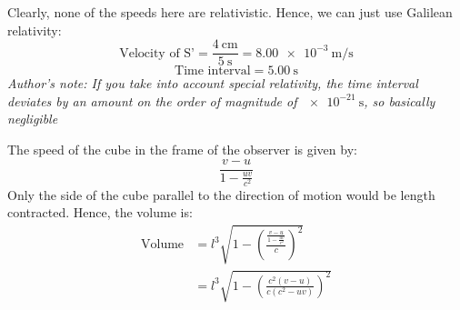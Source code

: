 \begin{solution}
    \begin{subsolution}
        Clearly, none of the speeds here are relativistic. Hence, we can just use Galilean relativity:
        \[\text{Velocity of S'}=\frac{\qty{4}{\cm}}{\qty{5}{\s}}=\boxed{\qty{8.00e-3}{\m\per\s}}\]
        \[\text{Time interval}=\boxed{\qty{5.00}{\s}}\]
        \textit{Author's note: If you take into account special relativity, the time interval deviates by an amount on the order of magnitude of $\qty{e-21}{\s}$, so basically negligible}
    \end{subsolution}
    \begin{subsolution}
        The speed of the cube in the frame of the observer is given by:
        \[\frac{v-u}{1-\frac{uv}{c^2}}\]
        Only the side of the cube parallel to the direction of motion would be length contracted. Hence, the volume is:
        \begin{align*}
            \text{Volume}&=l^3\sqrt{1-\left(\frac{\frac{v-u}{1-\frac{uv}{c^2}}}{c}\right)^2}\\
            &=\boxed{l^3\sqrt{1-\left(\frac{c^2(v-u)}{c\left(c^2-uv\right)}\right)^2}}
        \end{align*}
    \end{subsolution}
\end{solution}